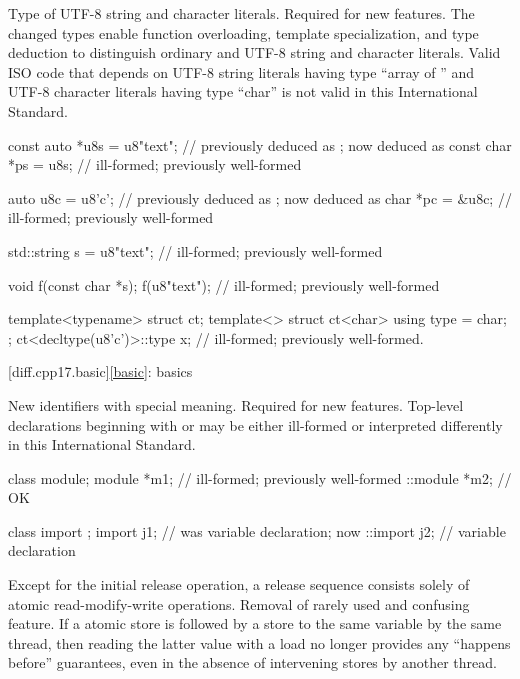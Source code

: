 \change Type of UTF-8 string and character literals.
\rationale Required for new features.
The changed types enable function overloading, template specialization, and
type deduction to distinguish ordinary and UTF-8 string and character literals.
\effect Valid ISO \CppXVII{} code that depends on
UTF-8 string literals having type ``array of '' and
UTF-8 character literals having type ``char''
is not valid in this International Standard.
\begin{codeblock}
const auto *u8s = u8"text";     //  previously deduced as ; now deduced as 
const char *ps = u8s;           // ill-formed; previously well-formed

auto u8c = u8'c';               //  previously deduced as ; now deduced as 
char *pc = &u8c;                // ill-formed; previously well-formed

std::string s = u8"text";       // ill-formed; previously well-formed

void f(const char *s);
f(u8"text");                    // ill-formed; previously well-formed

template<typename> struct ct;
template<> struct ct<char> {
  using type = char;
};
ct<decltype(u8'c')>::type x;    // ill-formed; previously well-formed.
\end{codeblock}

[diff.cpp17.basic]{\ref{basic}: basics}

\change New identifiers with special meaning.
\rationale Required for new features.
\effect Top-level declarations beginning with
 or  may
be either ill-formed or interpreted differently
in this International Standard.
\begin{example}
\begin{codeblock}
class module;
module *m1;         // ill-formed; previously well-formed
::module *m2;       // OK

class import {};
import j1;          // was variable declaration; now 
::import j2;        // variable declaration
\end{codeblock}
\end{example}

\change Except for the initial release operation,
a release sequence consists solely of atomic read-modify-write operations.
\rationale Removal of rarely used and confusing feature.
\effect If a  atomic store is followed
by a  store to the same variable by the same thread,
then reading the latter value with a  load
no longer provides any ``happens before'' guarantees,
even in the absence of intervening stores by another thread.

